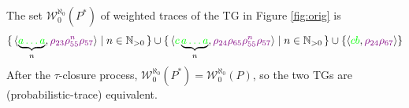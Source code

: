 \begin{example}
	The set $\mathcal{W}_0^{\aleph_0}(P^*)$ of weighted traces of the TG in Figure \ref{fig:orig} is
$$\set{\braket{\underbrace{\color{green}a\dots a}_{n},{\color{violet}\rho_{23}\rho_{55}^n\rho_{57}}}|n\in \mathbb{N}_{>0}}\cup \set{\braket{{\color{green}c}\underbrace{\color{green}a\dots a}_{n},{\color{violet}\rho_{24}\rho_{65}\rho_{55}^n\rho_{57}}}|n\in \mathbb{N}_{>0}}\cup\{\braket{{\color{green}cb},{\color{violet}\rho_{24}\rho_{67}}}\}$$
After the $\tau$-closure process, $\mathcal{W}_0^{\aleph_0}(P^*)=\mathcal{W}_0^{\aleph_0}(P)$, so the two TGs are (probabilistic-trace) equivalent.
\end{example}
